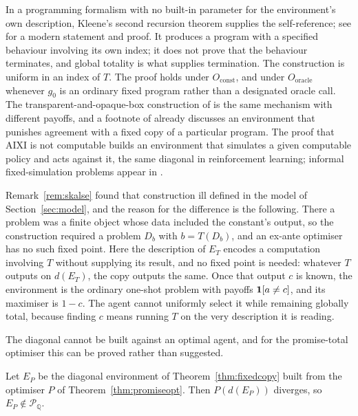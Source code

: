 In a programming formalism with no built-in parameter for the environment's own description,
Kleene's second recursion theorem \autocite{kleene1938} supplies the self-reference; see
\textcite{moschovakis2010} for a modern statement and proof. It produces a program with a specified
behaviour involving its own index; it does not prove that the behaviour terminates, and global
totality is what supplies termination. The construction is uniform in an index of $T$. The proof
holds under $O_{\mathrm{const}}$, and under $O_{\mathrm{oracle}}$ whenever $g_0$ is an ordinary fixed
program rather than a designated oracle call. The transparent-and-opaque-box construction of
\textcite{skalse2021} is the same mechanism with different payoffs, and a footnote of
\textcite[§9, n.~15]{yudkowskysoares2017} already discusses an environment that punishes agreement with a
fixed copy of a particular program. The proof that AIXI is not computable
\autocite[Thm.~14]{leikehutter2015aixi} builds an environment that simulates a given computable policy
and acts against it, the same diagonal in reinforcement learning; informal fixed-simulation problems
appear in \textcite{drnickbone2012}.

Remark~\ref{rem:skalse} found that construction ill defined in the model of
Section~\ref{sec:model}, and the reason for the difference is the following. There a problem was a finite object whose
data included the constant's output, so the construction required a problem $D_b$ with $b=T(D_b)$,
and an ex-ante optimiser has no such fixed point. Here the description of $E_T$ encodes a
computation involving $T$ without supplying its result, and no fixed point is needed: whatever $T$
outputs on $d(E_T)$, the copy outputs the same. Once that output $c$ is known, the environment is
the ordinary one-shot problem with payoffs $\mathbf{1}[a\ne c]$, and its maximiser is $1-c$. The agent
cannot uniformly select it while remaining globally total, because finding $c$ means running $T$ on
the very description it is reading.

The diagonal cannot be built against an optimal agent, and for the promise-total optimiser this can
be proved rather than suggested.

\begin{proposition}\label{prop:escape}
Let $E_P$ be the diagonal environment of Theorem~\ref{thm:fixedcopy} built from the optimiser $P$ of
Theorem~\ref{thm:promiseopt}. Then $P(d(E_P))$ diverges, so $E_P\notin\mathcal P_{\mathbb Q}$.
\end{proposition}

